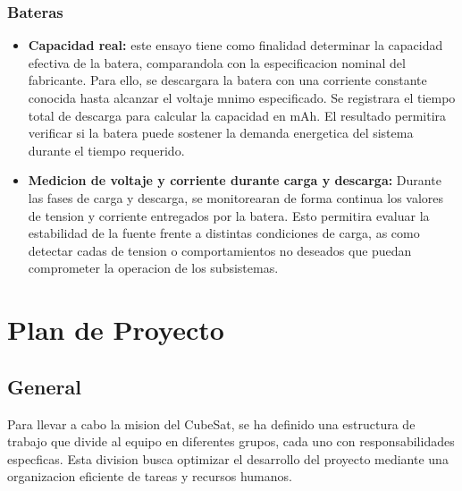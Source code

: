     \subsubsection{Bateras}
    \begin{itemize}
      \item \textbf{Capacidad real:} este ensayo tiene como finalidad determinar la capacidad efectiva
      de la batera, comparandola con la especificacion nominal del fabricante. Para ello, se
      descargara la batera con una corriente constante conocida hasta alcanzar el voltaje
      mnimo especificado. Se registrara el tiempo total de descarga para calcular la capacidad en mAh. El resultado permitira verificar si la batera puede sostener la demanda
      energetica del sistema durante el tiempo requerido.

      \item \textbf{Medicion de voltaje y corriente durante carga y descarga:} Durante las fases de
      carga y descarga, se monitorearan de forma continua los valores de tension y corriente
      entregados por la batera. Esto permitira evaluar la estabilidad de la fuente frente a
      distintas condiciones de carga, as como detectar cadas de tension o comportamientos
      no deseados que puedan comprometer la operacion de los subsistemas.
    \end{itemize}

\section{Plan de Proyecto}

  \subsection{General}
    Para llevar a cabo la mision del CubeSat, se ha definido una estructura de trabajo que
    divide al equipo en diferentes grupos, cada uno con responsabilidades especficas. Esta division
    busca optimizar el desarrollo del proyecto mediante una organizacion eficiente de tareas y
    recursos humanos.
